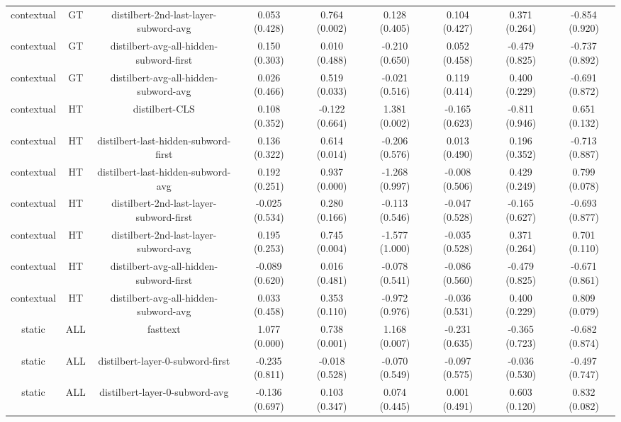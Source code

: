\begin{sidewaystable}[htb]
\begin{tabular}{@{}ccccccccc@{}}
        contextual & GT & distilbert-2nd-last-layer-subword-avg & 0.053 (0.428) & 0.764 (0.002) & 0.128 (0.405) & 0.104 (0.427) & 0.371 (0.264) & -0.854 (0.920) \\
        contextual & GT & distilbert-avg-all-hidden-subword-first & 0.150 (0.303) & 0.010 (0.488) & -0.210 (0.650) & 0.052 (0.458) & -0.479 (0.825) & -0.737 (0.892) \\
        contextual & GT & distilbert-avg-all-hidden-subword-avg & 0.026 (0.466) & 0.519 (0.033) & -0.021 (0.516) & 0.119 (0.414) & 0.400 (0.229) & -0.691 (0.872) \\
        contextual & HT & distilbert-CLS & 0.108 (0.352) & -0.122 (0.664) & 1.381 (0.002) & -0.165 (0.623) & -0.811 (0.946) & 0.651 (0.132) \\
        contextual & HT & distilbert-last-hidden-subword-first & 0.136 (0.322) & 0.614 (0.014) & -0.206 (0.576) & 0.013 (0.490) & 0.196 (0.352) & -0.713 (0.887) \\
        contextual & HT & distilbert-last-hidden-subword-avg & 0.192 (0.251) & 0.937 (0.000) & -1.268 (0.997) & -0.008 (0.506) & 0.429 (0.249) & 0.799 (0.078) \\
        contextual & HT & distilbert-2nd-last-layer-subword-first & -0.025 (0.534) & 0.280 (0.166) & -0.113 (0.546) & -0.047 (0.528) & -0.165 (0.627) & -0.693 (0.877) \\
        contextual & HT & distilbert-2nd-last-layer-subword-avg & 0.195 (0.253) & 0.745 (0.004) & -1.577 (1.000) & -0.035 (0.528) & 0.371 (0.264) & 0.701 (0.110) \\
        contextual & HT & distilbert-avg-all-hidden-subword-first & -0.089 (0.620) & 0.016 (0.481) & -0.078 (0.541) & -0.086 (0.560) & -0.479 (0.825) & -0.671 (0.861) \\
        contextual & HT & distilbert-avg-all-hidden-subword-avg & 0.033 (0.458) & 0.353 (0.110) & -0.972 (0.976) & -0.036 (0.531) & 0.400 (0.229) & 0.809 (0.079) \\
        static & ALL & fasttext & 1.077 (0.000) & 0.738 (0.001) & 1.168 (0.007) & -0.231 (0.635) & -0.365 (0.723) & -0.682 (0.874) \\
        static & ALL & distilbert-layer-0-subword-first & -0.235 (0.811) & -0.018 (0.528) & -0.070 (0.549) & -0.097 (0.575) & -0.036 (0.530) & -0.497 (0.747) \\
        static & ALL & distilbert-layer-0-subword-avg & -0.136 (0.697) & 0.103 (0.347) & 0.074 (0.445) & 0.001 (0.491) & 0.603 (0.120) & 0.832 (0.082) \\

\end{tabular}
\end{sidewaystable}
